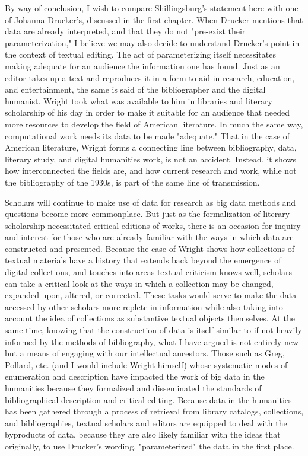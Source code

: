 By way of conclusion, I wish to compare Shillingsburg's statement here with one of Johanna Drucker's, discussed in the first chapter. When Drucker mentions that data are already interpreted, and that they do not "pre-exist their parameterization," I believe we may also decide to understand Drucker's point in the context of textual editing.\autocite[129]{drucker_graphesis_2014} The act of parameterizing itself necessitates making adequate for an audience the information one has found. Just as an editor takes up a text and reproduces it in a form to aid in research, education, and entertainment, the same is said of the bibliographer and the digital humanist. Wright took what was available to him in libraries and literary scholarship of his day in order to make it suitable for an audience that needed more resources to develop the field of American literature. In much the same way, computational work needs its data to be made "adequate." That in the case of American literature, Wright forms a connecting line between bibliography, data, literary study, and digital humanities work, is not an accident. Instead, it shows how interconnected the fields are, and how current research and work, while not the bibliography of the 1930s, is part of the same line of transmission.

Scholars will continue to make use of data for research as big data methods and questions become more commonplace. But just as the formalization of literary scholarship necessitated critical editions of works, there is an occasion for inquiry and interest for those who are already familiar with the ways in which data are constructed and presented. Because the case of Wright shows how collections of textual materials have a history that extends back beyond the emergence of digital collections, and touches into areas textual criticism knows well, scholars can take a critical look at the ways in which a collection may be changed, expanded upon, altered, or corrected. These tasks would serve to make the data accessed by other scholars more replete in information while also taking into account the idea of collections as substantive textual objects themselves. At the same time, knowing that the construction of data is itself similar to if not heavily informed by the methods of bibliography, what I have argued is not entirely new but a means of engaging with our intellectual ancestors. Those such as Greg, Pollard, etc. (and I would include Wright himself) whose systematic modes of enumeration and description have impacted the work of big data in the humanities because they formalized and disseminated the standards of bibliographical description and critical editing. Because data in the humanities has been gathered through a process of retrieval from library catalogs, collections, and bibliographies, textual scholars and editors are equipped to deal with the byproducts of data, because they are also likely familiar with the ideas that originally, to use Drucker's wording, "parameterized" the data in the first place.